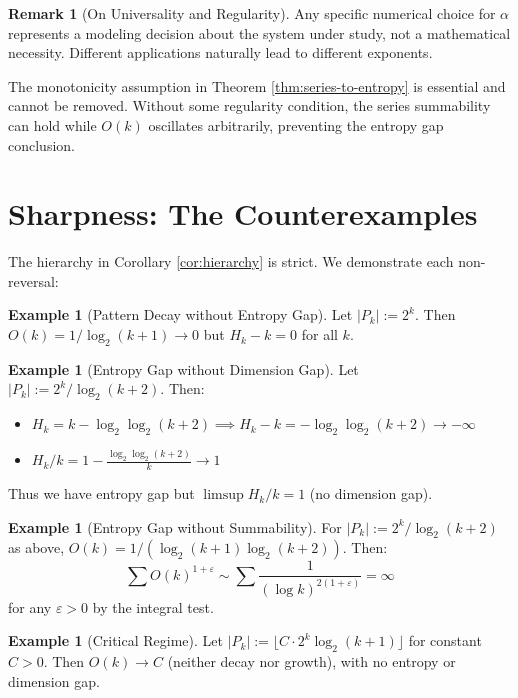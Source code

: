 \documentclass[11pt]{article}
\theoremstyle{definition}
\newtheorem{remark}[theorem]{Remark}
\newtheorem{example}[theorem]{Example}
\newcommand{\eps}{\varepsilon}
\begin{document}
\begin{remark}[On Universality and Regularity]\label{rem:universality}
Any specific numerical choice for $\alpha$ represents a modeling decision about the system under study, not a mathematical necessity. Different applications naturally lead to different exponents.

The monotonicity assumption in Theorem \ref{thm:series-to-entropy} is essential and cannot be removed. Without some regularity condition, the series summability can hold while $O(k)$ oscillates arbitrarily, preventing the entropy gap conclusion.
\end{remark}

\section{Sharpness: The Counterexamples}

The hierarchy in Corollary \ref{cor:hierarchy} is strict. We demonstrate each non-reversal:

\begin{example}[Pattern Decay without Entropy Gap]\label{ex:no-gap}
Let $|P_k| := 2^k$. Then $O(k) = 1/\log_2(k+1) \to 0$ but $H_k - k = 0$ for all $k$.
\end{example}

\begin{example}[Entropy Gap without Dimension Gap]\label{ex:entropy-no-dim}
Let $|P_k| := 2^k/\log_2(k+2)$. Then:
\begin{itemize}
\item $H_k = k - \log_2\log_2(k+2) \implies H_k - k = -\log_2\log_2(k+2) \to -\infty$
\item $H_k/k = 1 - \frac{\log_2\log_2(k+2)}{k} \to 1$
\end{itemize}
Thus we have entropy gap but $\limsup H_k/k = 1$ (no dimension gap).
\end{example}

\begin{example}[Entropy Gap without Summability]\label{ex:gap-no-sum}
For $|P_k| := 2^k/\log_2(k+2)$ as above, $O(k) = 1/(\log_2(k+1)\log_2(k+2))$. Then:
$$\sum O(k)^{1+\eps} \sim \sum \frac{1}{(\log k)^{2(1+\eps)}} = \infty$$
for any $\eps > 0$ by the integral test.
\end{example}

\begin{example}[Critical Regime]\label{ex:critical}
Let $|P_k| := \lfloor C \cdot 2^k \log_2(k+1) \rfloor$ for constant $C > 0$. Then $O(k) \to C$ (neither decay nor growth), with no entropy or dimension gap.
\end{example}
\end{document}
